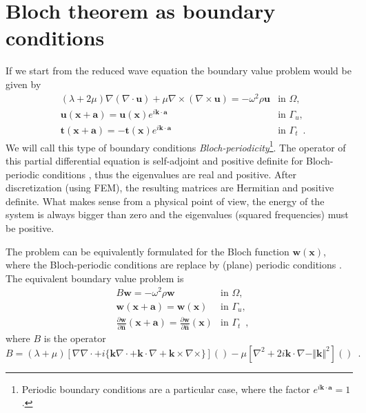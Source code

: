 \section{Bloch theorem as boundary conditions}
If we start from the reduced wave equation \cite{book:achenbach_waves} the boundary value problem would be given by
\begin{align*}
&(\lambda +2\mu)\nabla(\nabla\cdot \mathbf{u}) + \mu \nabla\times(\nabla\times\mathbf{u})= -\omega^2\rho\mathbf{u}  &\text{in\ } \Omega,\\
&\mathbf{u}(\mathbf{x}+\mathbf{a}) = \mathbf{u}(\mathbf{x})e^{i\mathbf{k}\cdot\mathbf{a}} &\text{in\ } \Gamma_u,\\
&\mathbf{t}(\mathbf{x}+\mathbf{a}) = -\mathbf{t}(\mathbf{x})e^{i\mathbf{k}\cdot\mathbf{a}} &\text{in\ } \Gamma_t \enspace .
\end{align*}
We will call this type of boundary conditions \emph{Bloch-periodicity}\footnote{Periodic boundary conditions are a particular case, where the factor $e^{i\mathbf{k}\cdot\mathbf{a}}=1$.}. The operator of this partial differential equation is self-adjoint and positive definite for Bloch-periodic conditions \cite{book:reddy_functional_analysis, book:kreyzsig_functional}, thus the eigenvalues are real and positive. After discretization (using FEM), the resulting matrices are Hermitian and positive definite. What makes sense from a physical point of view, the energy of the system is always bigger than zero and the eigenvalues (squared frequencies) must be positive.

The problem can be equivalently formulated for the Bloch function $\mathbf{w}(\mathbf{x})$, where the Bloch-periodic conditions are replace by (plane) periodic conditions \cite{book:PDE_gockenbach}. The equivalent boundary value problem is
\begin{align*}
&B\mathbf{w} = -\omega^2\rho\mathbf{w} &\text{in\ } \Omega,\\
&\mathbf{w}(\mathbf{x}+\mathbf{a}) = \mathbf{w}(\mathbf{x}) &\text{in\ } \Gamma_u,\\
&\frac{\partial \mathbf{w}}{\partial \hat{\mathbf{n}} }(\mathbf{x}+\mathbf{a}) = \frac{\partial \mathbf{w}}{ \partial \hat{\mathbf{n}} }(\mathbf{x}) &\text{in\ } \Gamma_t \enspace ,
\end{align*}
where $B$ is the operator
\[B = (\lambda+\mu)\left[ \nabla\nabla\cdot + i\lbrace\mathbf{k}\nabla\cdot + \mathbf{k}\cdot\nabla + \mathbf{k}\times\nabla\times\rbrace\right]() - \mu\left[ \nabla^2 + 2i\mathbf{k}\cdot\nabla - \Vert \mathbf{k} \Vert^2 \right]() \enspace .\]

